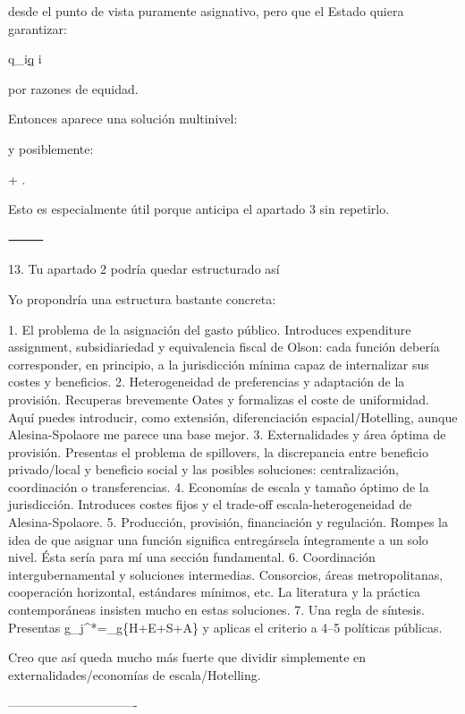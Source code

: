 \documentclass[10pt,a4paper]{article}
\begin{document}
desde el punto de vista puramente asignativo, pero que el Estado quiera garantizar:

q_i\geq\underline q
\qquad\forall i

por razones de equidad.

Entonces aparece una solución multinivel:


y posiblemente:

+
.

Esto es especialmente útil porque anticipa el apartado 3 sin repetirlo.

⸻

13. Tu apartado 2 podría quedar estructurado así

Yo propondría una estructura bastante concreta:

1. El problema de la asignación del gasto público. Introduces expenditure assignment, subsidiariedad y equivalencia fiscal de Olson: cada función debería corresponder, en principio, a la jurisdicción mínima capaz de internalizar sus costes y beneficios.  
2. Heterogeneidad de preferencias y adaptación de la provisión. Recuperas brevemente Oates y formalizas el coste de uniformidad. Aquí puedes introducir, como extensión, diferenciación espacial/Hotelling, aunque Alesina-Spolaore me parece una base mejor.  
3. Externalidades y área óptima de provisión. Presentas el problema de spillovers, la discrepancia entre beneficio privado/local y beneficio social y las posibles soluciones: centralización, coordinación o transferencias.
4. Economías de escala y tamaño óptimo de la jurisdicción. Introduces costes fijos y el trade-off escala-heterogeneidad de Alesina-Spolaore.  
5. Producción, provisión, financiación y regulación. Rompes la idea de que asignar una función significa entregársela íntegramente a un solo nivel. Ésta sería para mí una sección fundamental.  
6. Coordinación intergubernamental y soluciones intermedias. Consorcios, áreas metropolitanas, cooperación horizontal, estándares mínimos, etc. La literatura y la práctica contemporáneas insisten mucho en estas soluciones.  
7. Una regla de síntesis. Presentas g_j^*=\arg\min_g\{H+E+S+A\} y aplicas el criterio a 4–5 políticas públicas.

Creo que así queda mucho más fuerte que dividir simplemente en externalidades/economías de escala/Hotelling.


-------------------------------
\end{document}
